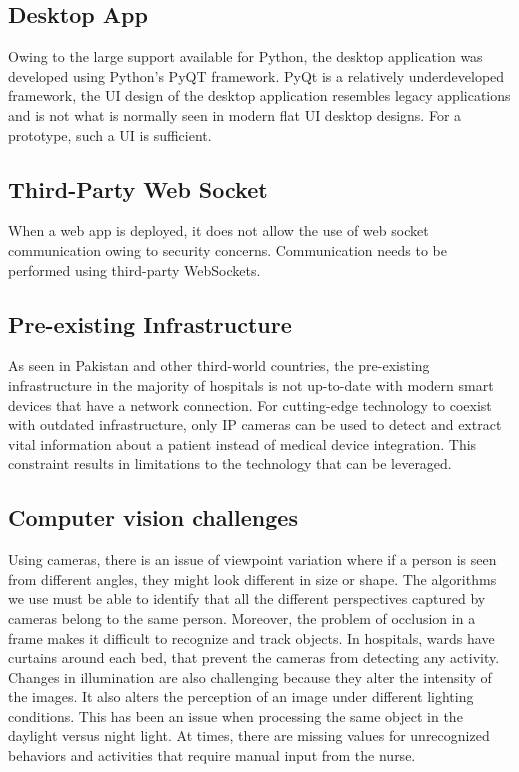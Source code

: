\subsection{Desktop App}
Owing to the large support available for Python, the desktop application was developed using Python's PyQT framework. PyQt is a relatively underdeveloped framework, the UI design of the desktop application resembles legacy applications and is not what is normally seen in modern flat UI desktop designs. For a prototype, such a UI is sufficient.

\subsection{Third-Party Web Socket}
When a web app is deployed, it does not allow the use of web socket communication owing to security concerns. Communication needs to be performed using third-party WebSockets.

\subsection{Pre-existing Infrastructure}
As seen in Pakistan and other third-world countries, the pre-existing infrastructure in the majority of hospitals is not up-to-date with modern smart devices that have a network connection. For cutting-edge technology to coexist with outdated infrastructure, only IP cameras can be used to detect and extract vital information about a patient instead of medical device integration. This constraint results in limitations to the technology that can be leveraged.

\subsection{Computer vision challenges}
Using cameras, there is an issue of viewpoint variation where if a person is seen from different angles, they might look different in size or shape. The algorithms we use must be able to identify that all the different perspectives captured by cameras belong to the same person. Moreover, the problem of occlusion in a frame makes it difficult to recognize and track objects. In hospitals, wards have curtains around each bed, that prevent the cameras from detecting any activity. Changes in illumination are also challenging because they alter the intensity of the images. It also alters the perception of an image under different lighting conditions. This has been an issue when processing the same object in the daylight versus night light. At times, there are missing values for unrecognized behaviors and activities that require manual input from the nurse.

